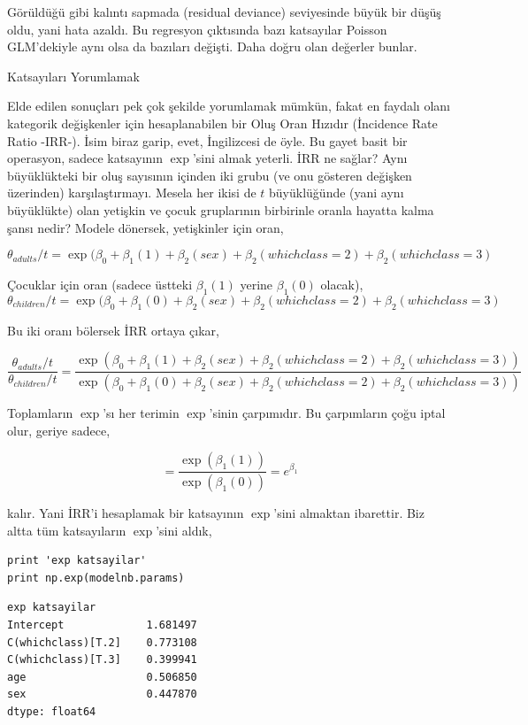 \documentclass[12pt,fleqn]{article}\usepackage{../../common}
\begin{document}
Görüldüğü gibi kalıntı sapmada (residual deviance) seviyesinde büyük bir
düşüş oldu, yani hata azaldı. Bu regresyon çıktısında bazı katsayılar
Poisson GLM'dekiyle aynı olsa da bazıları değişti. Daha doğru olan değerler
bunlar.

Katsayıları Yorumlamak

Elde edilen sonuçları pek çok şekilde yorumlamak mümkün, fakat en faydalı
olanı kategorik değişkenler için hesaplanabilen bir Oluş Oran Hızıdır
(İncidence Rate Ratio -IRR-). İsim biraz garip, evet, İngilizcesi de öyle.
Bu gayet basit bir operasyon, sadece katsayının $\exp$'sini almak
yeterli. İRR ne sağlar? Aynı büyüklükteki bir oluş sayısının içinden iki
grubu (ve onu gösteren değişken üzerinden) karşılaştırmayı. Mesela her
ikisi de $t$ büyüklüğünde (yani aynı büyüklükte) olan yetişkin ve çocuk
gruplarının birbirinle oranla hayatta kalma şansı nedir? Modele dönersek,
yetişkinler için oran,

$$ \theta_{adults} / t = \exp ( \beta_0 + \beta_1(1) + \beta_2(sex) + \beta_2(whichclass=2) + \beta_2(whichclass=3)  $$

Çocuklar için oran (sadece üstteki $\beta_1(1)$ yerine $\beta_1(0)$ olacak),
$$ \theta_{children} / t = \exp ( \beta_0 + \beta_1(0) + \beta_2(sex) + \beta_2(whichclass=2) + \beta_2(whichclass=3)  $$

Bu iki oranı bölersek İRR ortaya çıkar, 

$$ 
\frac{\theta_{adults} / t}{\theta_{children} / t} = 
\frac
{\exp ( \beta_0 + \beta_1(1) + \beta_2(sex) + \beta_2(whichclass=2) + \beta_2(whichclass=3))}
{\exp ( \beta_0 + \beta_1(0) + \beta_2(sex) + \beta_2(whichclass=2) + \beta_2(whichclass=3))}
$$

Toplamların $\exp$'sı her terimin $\exp$'sinin çarpımıdır. Bu çarpımların
çoğu iptal olur, geriye sadece,

$$ =
\frac{\exp ( \beta_1(1))} {\exp ( \beta_1(0) ) } = 
e^{\beta_1}
$$

kalır. Yani İRR'i hesaplamak bir katsayının $\exp$'sini almaktan
ibarettir. Biz altta tüm katsayıların $\exp$'sini aldık,

\begin{verbatim}
print 'exp katsayilar'
print np.exp(modelnb.params)
\end{verbatim}

\begin{verbatim}
exp katsayilar
Intercept             1.681497
C(whichclass)[T.2]    0.773108
C(whichclass)[T.3]    0.399941
age                   0.506850
sex                   0.447870
dtype: float64
\end{verbatim}
\end{document}
